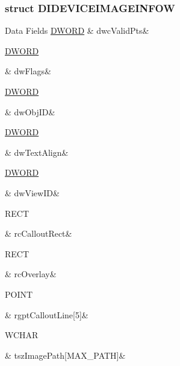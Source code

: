 \subsubsection{struct D\-I\-D\-E\-V\-I\-C\-E\-I\-M\-A\-G\-E\-I\-N\-F\-O\-W}
\begin{DoxyFields}{Data Fields}
\hypertarget{a00003_af9858cc24e795ccd4ca036d6eff605c5}{\hyperlink{a00003_a50e15ae51c87ae06ab29c8148cb5f36c}{D\-W\-O\-R\-D}}\label{a00003_af9858cc24e795ccd4ca036d6eff605c5}
&
dwc\-Valid\-Pts&
\\
\hline

\hypertarget{a00003_a4d2f405b1141000eb2af256e0fc8b98b}{\hyperlink{a00003_a50e15ae51c87ae06ab29c8148cb5f36c}{D\-W\-O\-R\-D}}\label{a00003_a4d2f405b1141000eb2af256e0fc8b98b}
&
dw\-Flags&
\\
\hline

\hypertarget{a00003_aa3e360cabf4f9859e8b8af2111846936}{\hyperlink{a00003_a50e15ae51c87ae06ab29c8148cb5f36c}{D\-W\-O\-R\-D}}\label{a00003_aa3e360cabf4f9859e8b8af2111846936}
&
dw\-Obj\-I\-D&
\\
\hline

\hypertarget{a00003_a47f3a9ec63e7a4ba7849c1b68cc943db}{\hyperlink{a00003_a50e15ae51c87ae06ab29c8148cb5f36c}{D\-W\-O\-R\-D}}\label{a00003_a47f3a9ec63e7a4ba7849c1b68cc943db}
&
dw\-Text\-Align&
\\
\hline

\hypertarget{a00003_a56443b33966d84bee297c53ce5d6485f}{\hyperlink{a00003_a50e15ae51c87ae06ab29c8148cb5f36c}{D\-W\-O\-R\-D}}\label{a00003_a56443b33966d84bee297c53ce5d6485f}
&
dw\-View\-I\-D&
\\
\hline

\hypertarget{a00003_a72a60e5a6f70b986db5ab21a21e74541}{R\-E\-C\-T}\label{a00003_a72a60e5a6f70b986db5ab21a21e74541}
&
rc\-Callout\-Rect&
\\
\hline

\hypertarget{a00003_a8770661a12d52276cdd2b6c00fa20023}{R\-E\-C\-T}\label{a00003_a8770661a12d52276cdd2b6c00fa20023}
&
rc\-Overlay&
\\
\hline

\hypertarget{a00003_a136480dcf2273292cd4126ee415744df}{P\-O\-I\-N\-T}\label{a00003_a136480dcf2273292cd4126ee415744df}
&
rgpt\-Callout\-Line\mbox{[}5\mbox{]}&
\\
\hline

\hypertarget{a00003_a2e113217fd6165f21c08101f19ef9dcb}{W\-C\-H\-A\-R}\label{a00003_a2e113217fd6165f21c08101f19ef9dcb}
&
tsz\-Image\-Path\mbox{[}M\-A\-X\-\_\-\-P\-A\-T\-H\mbox{]}&
\\
\hline

\end{DoxyFields}
\label{d6/d2c/a00072}
\hypertarget{a00003_d6/d2c/a00072}{}
